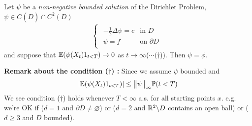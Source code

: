 \documentclass[12pt,a4paper]{report}
\begin{document}
 Let $\psi$ be a \emph{non-negative bounded solution} of the Dirichlet Problem, $\psi \in C(\overline{D}) \cap C^2(D)$
\begin{align*}
\begin{cases}
\begin{array}{ll}
-\frac{1}{2} \Delta \psi = c & \text{in } D \\
\psi = f & \text{on } \partial D
\end{array}
\end{cases}
\end{align*}
and suppose that $\mathbb{E}(\psi(X_t)1_{t<T}) \rightarrow 0$ as $t\rightarrow \infty$($\cdots (\dagger$)). Then $\psi = \phi$.

\textbf{Remark about the condition ($\dagger$) :} Since we assume $\psi$ bounded and
\begin{align*}
|\mathbb{E}(\psi (X_t) 1_{t<T})| \leq \bigl\lVert\psi\bigr\rVert_{\infty} \mathbb{P}(t< T)
\end{align*}
We see condition ($\dagger$) holds whenever $T< \infty$ a.s. for all starting points $x$. e.g. we're OK if ($d=1$ and $\partial D \neq \varnothing$) or ($d=2$ and $\mathbb{R}^2 \backslash D$ contains an open ball) or ($d\geq 3$ and $D$ bounded).
\end{document}
